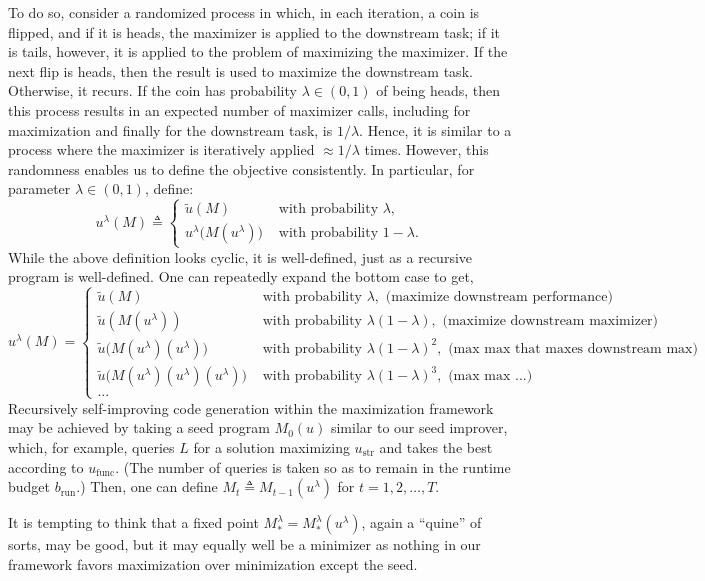 \documentclass{article} %
\newcommand{\maxutil}{{\tilde{u}}}
\newcommand{\defeq}{\triangleq}
\begin{document}
To do so, consider a randomized process in which, in each iteration, a coin is flipped, and if it is heads, the maximizer is applied to the downstream task; if it is tails, however, it is applied to the problem of maximizing the maximizer. If the next flip is heads, then the result is used to maximize the downstream task. Otherwise, it recurs. If the coin has probability $\lambda \in (0,1)$ of being heads, then this process results in an expected number of maximizer calls, including for maximization and finally for the downstream task, is $1/\lambda$. Hence, it is similar to a process where the maximizer is iteratively applied $\approx 1/\lambda$ times.
However, this randomness enables us to define the objective consistently. In particular, for parameter $\lambda \in (0,1)$, define:
\[u^\lambda(M) \defeq 
\begin{cases}
\maxutil(M)
 & \text{ with probability } \lambda,\\
u^\lambda\bigl(M(u^\lambda)\bigr) & \text{ with probability } 1-\lambda.
\end{cases}
\]
While the above definition looks cyclic, it is well-defined, just as a recursive program is well-defined.
One can repeatedly expand the bottom case to get,
\[u^\lambda(M) =
\begin{cases}
\maxutil(M) & \text{ with probability } \lambda, \text{ (maximize downstream performance)}\\
\maxutil(M(u^\lambda)) & \text{ with probability } \lambda(1-\lambda), \text{ (maximize downstream maximizer)} \\
\maxutil\bigl(M(u^\lambda)(u^\lambda)\bigr) & \text{ with probability } \lambda(1-\lambda)^2, \text{ (max max that maxes downstream max)}\\
\maxutil\bigl(M(u^\lambda)(u^\lambda)(u^\lambda)\bigr) & \text{ with probability } \lambda(1-\lambda)^3, \text{ (max max ...)}\\
... & 
\end{cases}
\]
Recursively self-improving code generation within the maximization framework may be achieved by taking a seed program $M_0(u)$ similar to our seed improver, which, for example, queries $L$ for a solution maximizing $u_\text{str}$ and takes the best according to $u_\text{func}$. (The number of queries is taken so as to remain in the runtime budget $b_\text{run}$.) Then, one can define $M_t \defeq M_{t-1}(u^\lambda)$ for $t=1,2,\ldots,T.$

It is tempting to think that a fixed point $M_*^\lambda=M_*^\lambda(u^\lambda)$, again a ``quine'' of sorts, may be good, but it may equally well be a minimizer as nothing in our framework favors maximization over minimization except the seed.  %
\end{document}
